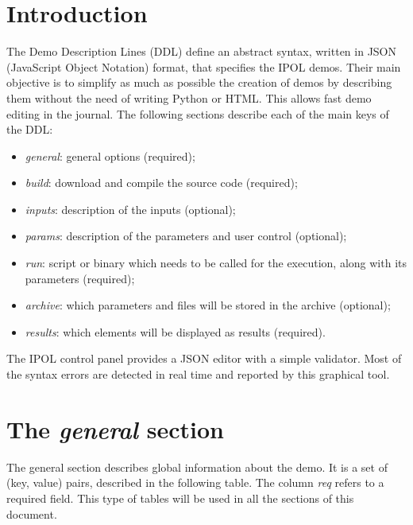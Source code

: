 \section{Introduction}
The Demo Description Lines (DDL) define an abstract syntax, written in JSON (JavaScript Object Notation) format, that specifies the IPOL demos. Their main objective is to simplify as much as possible the creation of demos by describing them without the need of writing Python or HTML. This allows fast demo editing in the journal. The following sections describe each of the main keys of the DDL:

\begin{itemize}
  \item \textit{general}: general options (required);
  \item \textit{build}: download and compile the source code (required);
  \item \textit{inputs}: description of the inputs  (optional);
  \item \textit{params}: description of the parameters and user control (optional);
  \item \textit{run}: script or binary which needs to be called for the execution, along with its parameters (required);
  \item \textit{archive}: which parameters and files will be stored in the archive (optional);
  \item \textit{results}: which elements will be displayed as results (required).
\end{itemize}

\vspace{1em}

The IPOL control panel provides a JSON editor with a simple validator. Most of the syntax errors are detected in real time and reported by this graphical tool.

\section{The \emph{general} section}
The general section describes global information about the demo. It is a set of (key, value) pairs, described in the following table. The column \emph{req} refers to a required field. This type of tables will be used in all the sections of this document.

